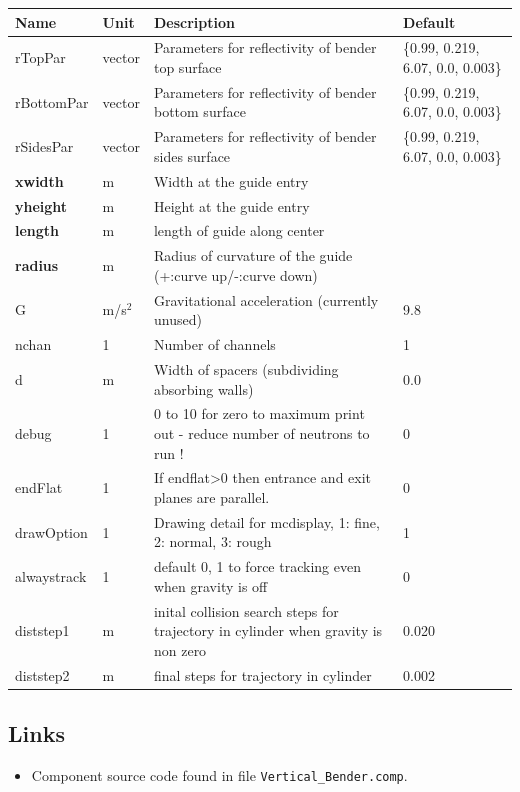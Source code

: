\begin{longtable}{p{}p{}p{}p{}}
\toprule
\textbf{Name} & \textbf{Unit} & \textbf{Description} & \textbf{Default} \\
\midrule
\endhead
rTopPar & vector & Parameters for reflectivity of bender top surface & \{0.99, 0.219, 6.07, 0.0, 0.003\} \\
rBottomPar & vector & Parameters for reflectivity of bender bottom surface & \{0.99, 0.219, 6.07, 0.0, 0.003\} \\
rSidesPar & vector & Parameters for reflectivity of bender sides surface & \{0.99, 0.219, 6.07, 0.0, 0.003\} \\
\textbf{xwidth} & m & Width at the guide entry &  \\
\textbf{yheight} & m & Height at the guide entry &  \\
\textbf{length} & m & length of guide along center &  \\
\textbf{radius} & m & Radius of curvature of the guide (+:curve up/-:curve down) &  \\
G & m/s$^{2}$ & Gravitational acceleration (currently unused) & 9.8 \\
nchan & 1 & Number of channels & 1 \\
d & m & Width of spacers (subdividing absorbing walls) & 0.0 \\
debug & 1 & 0 to 10 for zero to maximum print out - reduce number of neutrons to run ! & 0 \\
endFlat & 1 & If endflat\textgreater{}0 then entrance and exit planes are parallel. & 0 \\
drawOption & 1 & Drawing detail for mcdisplay, 1: fine, 2: normal, 3: rough & 1 \\
alwaystrack & 1 & default 0, 1 to force tracking even when gravity is off & 0 \\
diststep1 & m & inital collision search steps for trajectory in cylinder when gravity is non zero & 0.020 \\
diststep2 & m & final steps for trajectory in cylinder & 0.002 \\
\bottomrule
\end{longtable}

\subsection*{Links}
\begin{itemize}
  \item Component source code found in file \texttt{Vertical\_Bender.comp}.
\end{itemize}
